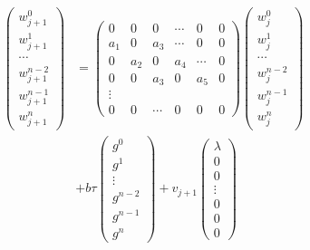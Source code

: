 \documentclass{ifacconf}
\begin{document}
\begin{align}
 \begin{pmatrix} w^0_{j+1} \\ w^1_{j+1} \\ \cdots \\ w^{n-2}_{j+1} \\ w^{n-1}_{j+1} \\ w^{n}_{j+1}  \end{pmatrix} &= \left( \begin{matrix}
0 & 0 & 0 & \cdots & 0 & 0 \\
a_{1} & 0 & a_{3} & \cdots & 0 & 0\\
0 & a_{2} & 0 & a_{4} & \cdots & 0\\
0 & 0 & a_{3} & 0 & a_5 & 0\\
\vdots \\
0 & 0 & \cdots &  0 & 0 & 0  \end{matrix} \right) \begin{pmatrix} w^0_j \\ w^1_j \\ \cdots \\ w^{n-2}_j \\ w^{n-1}_j \\ w^{n}_j\end{pmatrix}  \\
&+ b\tau \begin{pmatrix} g^0 \\ g^1 \\ \vdots \\ g^{n-2} \\ g^{n-1} \\ g^{n} \end{pmatrix} + v_{j+1} \begin{pmatrix}
\lambda \\ 0  \\ 0  \\ \vdots \\ 0 \\ 0 \\ 0
\end{pmatrix}
\end{align}
\end{document}
